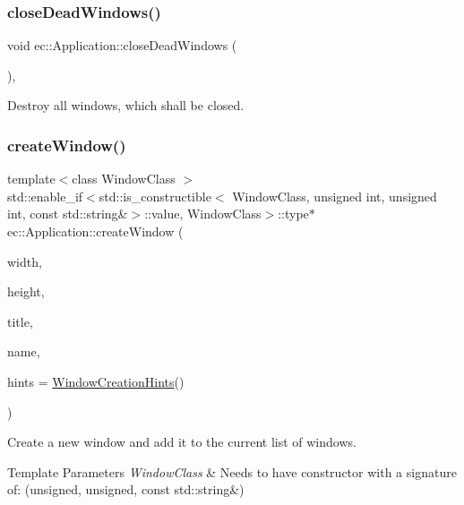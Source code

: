 \subsubsection{\texorpdfstring{close\+Dead\+Windows()}{closeDeadWindows()}}
{\footnotesize\ttfamily void ec\+::\+Application\+::close\+Dead\+Windows (\begin{DoxyParamCaption}{ }\end{DoxyParamCaption})\hspace{0.3cm}{\ttfamily [protected]}, {\ttfamily [virtual]}}



Destroy all windows, which shall be closed. 

\mbox{\label{classec_1_1_application_af103b97a3296f63ec0597756628e26f9}} 
\subsubsection{\texorpdfstring{create\+Window()}{createWindow()}\hspace{0.1cm}{\footnotesize\ttfamily [1/2]}}
{\footnotesize\ttfamily template$<$class Window\+Class $>$ \\
std\+::enable\+\_\+if$<$std\+::is\+\_\+constructible$<$ Window\+Class, unsigned int, unsigned int, const std\+::string\&$>$\+::value, Window\+Class$>$\+::type$\ast$ ec\+::\+Application\+::create\+Window (\begin{DoxyParamCaption}\item[{unsigned int}]{width,  }\item[{unsigned int}]{height,  }\item[{const std\+::string \&}]{title,  }\item[{const std\+::string \&}]{name,  }\item[{\mbox{\hyperlink{structec_1_1_window_creation_hints}{Window\+Creation\+Hints}}}]{hints = {\ttfamily \mbox{\hyperlink{structec_1_1_window_creation_hints}{Window\+Creation\+Hints}}()} }\end{DoxyParamCaption})}



Create a new window and add it to the current list of windows. 


\begin{DoxyTemplParams}{Template Parameters}
{\em Window\+Class} & Needs to have constructor with a signature of\+: (unsigned, unsigned, const std\+::string\&) \\
\hline
\end{DoxyTemplParams}

